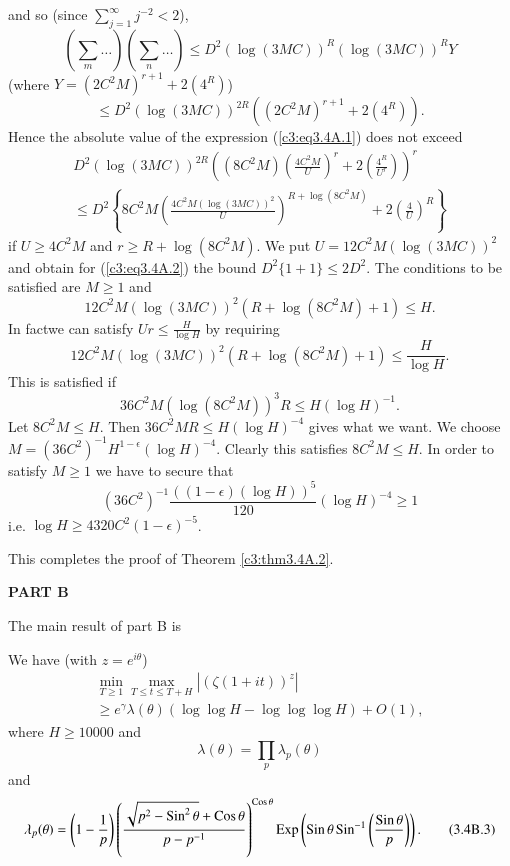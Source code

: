 and so (since $\sum\limits^\infty_{j=1} j^{-2} < 2$),
$$
\left(\sum\limits_m \ldots  \right) \left( \sum\limits_n \ldots \right) \leq D^2 (\log (3MC))^R(\log (3MC))^R Y
$$
(where $Y = (2C^2 M)^{r+1} + 2 (4^R)$)
$$
\leq D^2 (\log (3MC))^{2R} ((2C^2 M)^{r+1} + 2 (4^R)).
$$
Hence the absolute value of the expression (\ref{c3:eq3.4A.1}) does not exceed
\begin{gather*}
D^2 (\log (3MC))^{2R} \left((8C^2 M) \left(\frac{4C^2 M}{U} \right)^r  + 2 \left( \frac{4^R}{U^r} \right)\right)^r \tag{3.4A.2}\label{c3:eq3.4A.2}\\
\leq D^2 \left\{ 8C^2 M \left(\frac{4C^2 M (\log (3 MC))^2}{U} \right)^{R+ \log (8C^2 M)} + 2 \left(\frac{4}{U} \right)^R\right\}
\end{gather*}
if $U \geq 4 C^2 M$ and $r \geq R + \log (8C^2 M)$. We put $U = 12C^2 M (\log (3MC))^2$ and obtain for (\ref{c3:eq3.4A.2}) the bound $D^2 \{1+1\} \leq 2 D^2$. The conditions to be satisfied are $M \geq 1$ and 
$$
12 C^2 M (\log (3 MC))^2 (R + \log (8C^2 M) +1) \leq H.
$$ 
In fact\pageoriginale we can satisfy $Ur \leq \frac{H}{\log H}$ by requiring 
$$
12 C^2 M (\log (3MC))^2 (R + \log (8C^2 M) +1) \leq \frac{H}{\log H}.
$$
This is satisfied if
$$
36 C^2 M (\log (8C^2 M))^3 R \leq H (\log H)^{-1}.
$$
Let $8C^2 M \leq H$. Then $36C^2 MR \leq H (\log H)^{-4}$ gives what we want. We choose $M = (36 C^2)^{-1} H^{1-\epsilon} (\log H)^{-4}$. Clearly this satisfies $8C^2 M \leq H$. In order to satisfy $M \geq 1$ we have to secure that 
$$
(36 C^2)^{-1} \frac{((1-\epsilon) (\log H))^5}{120} (\log H)^{-4} \geq 1
$$
i.e. $\log H \geq 4320 C^2(1-\epsilon)^{-5}$.

This completes the proof of Theorem \ref{c3:thm3.4A.2}.

\newpage

\begin{center}
\textbf{PART B}
\end{center}

The main result of part B is 


\setcounter{alphtheorem}{0}
\setcounter{npart}{2}
\begin{alphtheorem}\label{c3:thm3.4B.1}
We have (with $z=e^{i\theta}$)
\begin{gather*}
\min\limits_{T \geq 1} \max\limits_{T \leq t \leq T + H} |(\zeta (1+it))^z|\\
\geq e^\gamma \lambda (\theta) (\log \log H - \log \log \log H) + O(1), \tag{3.4B.1}\label{c3:eq3.4B.1}
\end{gather*}
where $H \geq 10000$ and 
\begin{equation*}
\lambda (\theta) = \prod\limits_{p} \lambda_p(\theta) \tag{3.4B.2}\label{c3:eq3.4B.2}
\end{equation*}
and 
\begin{equation*}
\lambda_p (\theta) = \left(1-\frac{1}{p} \right) \left(\frac{\sqrt{p^2 - \operatorname{Sin}^2 \theta} + \operatorname{Cos} \theta}{p-p^{-1}} \right)^{\operatorname{Cos} \theta} \operatorname{Exp} \left( \operatorname{Sin} \theta \operatorname{Sin}^{-1} \left(\frac{\operatorname{Sin} \theta}{p}\right)\right).  \tag{3.4B.3}\label{c3:eq3.4B.3}
\end{equation*}
\end{alphtheorem}

